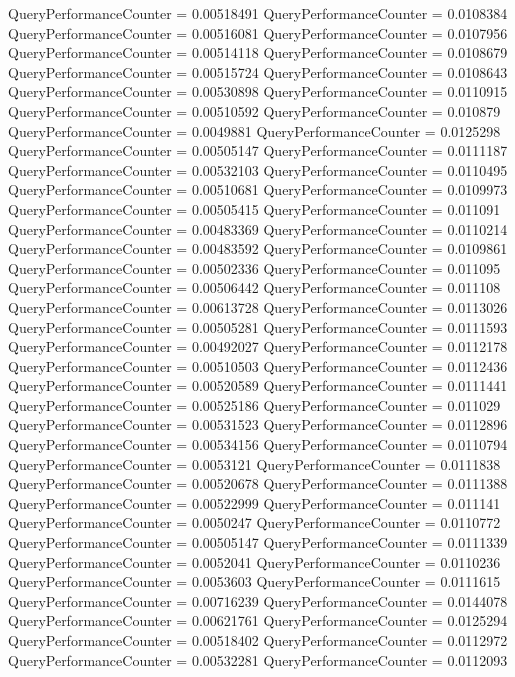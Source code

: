 \documentclass[9pt]{article}
\theoremstyle{plain}
\theoremstyle{definition}
\theoremstyle{remark}
\numberwithin{equation}{section}
\begin{document}
QueryPerformanceCounter  =  0.00518491
QueryPerformanceCounter  =  0.0108384
QueryPerformanceCounter  =  0.00516081
QueryPerformanceCounter  =  0.0107956
QueryPerformanceCounter  =  0.00514118
QueryPerformanceCounter  =  0.0108679
QueryPerformanceCounter  =  0.00515724
QueryPerformanceCounter  =  0.0108643
QueryPerformanceCounter  =  0.00530898
QueryPerformanceCounter  =  0.0110915
QueryPerformanceCounter  =  0.00510592
QueryPerformanceCounter  =  0.010879
QueryPerformanceCounter  =  0.0049881
QueryPerformanceCounter  =  0.0125298
QueryPerformanceCounter  =  0.00505147
QueryPerformanceCounter  =  0.0111187
QueryPerformanceCounter  =  0.00532103
QueryPerformanceCounter  =  0.0110495
QueryPerformanceCounter  =  0.00510681
QueryPerformanceCounter  =  0.0109973
QueryPerformanceCounter  =  0.00505415
QueryPerformanceCounter  =  0.011091
QueryPerformanceCounter  =  0.00483369
QueryPerformanceCounter  =  0.0110214
QueryPerformanceCounter  =  0.00483592
QueryPerformanceCounter  =  0.0109861
QueryPerformanceCounter  =  0.00502336
QueryPerformanceCounter  =  0.011095
QueryPerformanceCounter  =  0.00506442
QueryPerformanceCounter  =  0.011108
QueryPerformanceCounter  =  0.00613728
QueryPerformanceCounter  =  0.0113026
QueryPerformanceCounter  =  0.00505281
QueryPerformanceCounter  =  0.0111593
QueryPerformanceCounter  =  0.00492027
QueryPerformanceCounter  =  0.0112178
QueryPerformanceCounter  =  0.00510503
QueryPerformanceCounter  =  0.0112436
QueryPerformanceCounter  =  0.00520589
QueryPerformanceCounter  =  0.0111441
QueryPerformanceCounter  =  0.00525186
QueryPerformanceCounter  =  0.011029
QueryPerformanceCounter  =  0.00531523
QueryPerformanceCounter  =  0.0112896
QueryPerformanceCounter  =  0.00534156
QueryPerformanceCounter  =  0.0110794
QueryPerformanceCounter  =  0.0053121
QueryPerformanceCounter  =  0.0111838
QueryPerformanceCounter  =  0.00520678
QueryPerformanceCounter  =  0.0111388
QueryPerformanceCounter  =  0.00522999
QueryPerformanceCounter  =  0.011141
QueryPerformanceCounter  =  0.0050247
QueryPerformanceCounter  =  0.0110772
QueryPerformanceCounter  =  0.00505147
QueryPerformanceCounter  =  0.0111339
QueryPerformanceCounter  =  0.0052041
QueryPerformanceCounter  =  0.0110236
QueryPerformanceCounter  =  0.0053603
QueryPerformanceCounter  =  0.0111615
QueryPerformanceCounter  =  0.00716239
QueryPerformanceCounter  =  0.0144078
QueryPerformanceCounter  =  0.00621761
QueryPerformanceCounter  =  0.0125294
QueryPerformanceCounter  =  0.00518402
QueryPerformanceCounter  =  0.0112972
QueryPerformanceCounter  =  0.00532281
QueryPerformanceCounter  =  0.0112093
\end{document}

